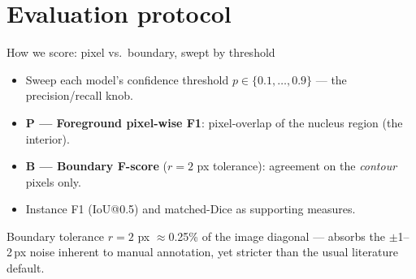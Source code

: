 \section{Evaluation protocol}

\begin{frame}{How we score: pixel vs.\ boundary, swept by threshold}
    \begin{itemize}
        \item Sweep each model's confidence threshold $p \in \{0.1,\dots,0.9\}$ --- the precision/recall knob.
        \item \textbf{P --- Foreground pixel-wise F1}: pixel-overlap of the nucleus region (the interior).
        \item \textbf{B --- Boundary F-score} ($r{=}2$ px tolerance): agreement on the \emph{contour} pixels only.
        \item Instance F1 (IoU@0.5) and matched-Dice as supporting measures.
    \end{itemize}

    \vspace{0.5em}
    \begin{block}{Boundary tolerance $r{=}2$ px}
        $\approx$0.25\% of the image diagonal --- absorbs the $\pm$1--2\,px noise inherent to manual annotation, yet stricter than the usual literature default.
    \end{block}
\end{frame}

